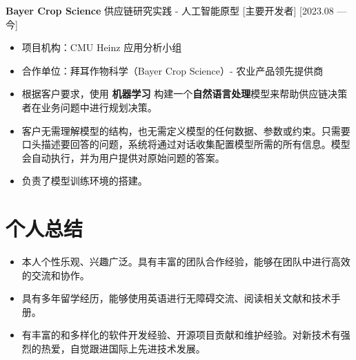 \documentclass{resume}
\begin{document}
\ResumeItem[Bayer Crop Science]
{\textbf{Bayer Crop Science} 供应链研究实践 - 人工智能原型} %
[主要开发者]
[2023.08 — 今]

\begin{itemize}
  \item 项目机构：CMU Heinz 应用分析小组
  \item 合作单位：拜耳作物科学（Bayer Crop Science）- 农业产品领先提供商
  \item 根据客户要求，使用 \textbf{机器学习} 构建一个\textbf{自然语言处理}模型来帮助供应链决策者在业务问题中进行规划决策。
  \item 客户无需理解模型的结构，也无需定义模型的任何数据、参数或约束。只需要口头描述要回答的问题，系统将通过对话收集配置模型所需的所有信息。模型会自动执行，并为用户提供对原始问题的答案。
  \item 负责了模型训练环境的搭建。
\end{itemize}

\section{个人总结}

\begin{itemize}
  \item 本人个性乐观、兴趣广泛。具有丰富的团队合作经验，能够在团队中进行高效的交流和协作。
  \item 具有多年留学经历，能够使用英语进行无障碍交流、阅读相关文献和技术手册。
  \item 有丰富的和多样化的软件开发经验、开源项目贡献和维护经验。对新技术有强烈的热爱，自觉跟进国际上先进技术发展。
\end{itemize}
\end{document}
